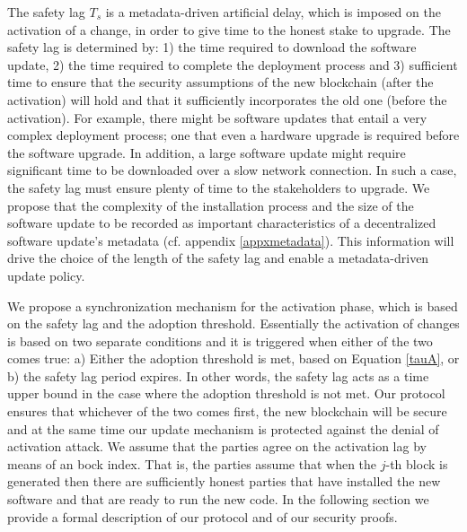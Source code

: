 The safety lag $T_s$ is a metadata-driven artificial delay, which is imposed on the activation of a change, in order to give time to the honest stake to upgrade. The safety lag is determined by: 1) the time required to download the software update, 2) the time required to complete the deployment process and 3) sufficient time to ensure that the security assumptions of the new blockchain (after the activation) will hold and that it sufficiently incorporates the old one (before the activation). For example, there might be software updates that entail a very complex deployment process; one that even  a hardware upgrade is required before the software upgrade. In addition, a large software update might require significant time to be downloaded over a slow network connection. In such a case, the safety lag must ensure plenty of time to the stakeholders to upgrade.  
We propose that the complexity of the installation process and the size of the software update to be recorded as important characteristics of a decentralized software update's metadata (cf. appendix \ref{appxmetadata}). This information will drive the choice of the length of the safety lag and enable a metadata-driven update policy.


We propose a synchronization mechanism for the activation phase, which is based on the safety lag and the adoption threshold. Essentially the activation of changes is based on two separate conditions and it is triggered when either of the two comes true: a) Either the adoption threshold is met, based on Equation \ref{tauA}, or b) the safety lag period expires. In other words, the safety lag acts as a time upper bound in the case where the adoption threshold is not met. Our protocol ensures that whichever of the two comes first, the new blockchain will be secure and at the same time our update mechanism is protected against the denial of activation attack. 
We assume that the parties agree on the activation lag by means of an bock index. That is, the parties assume that when the $j$-th block 
is generated then there are sufficiently honest parties that have installed the new software and that are ready to run the new code. 
In the following section we provide a formal description of our protocol and of our security proofs. 





